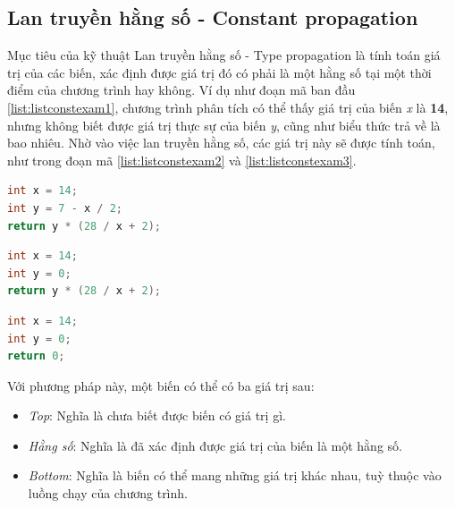 \subsection{Lan truyền hằng số - Constant propagation}
Mục tiêu của kỹ thuật Lan truyền hằng số - Type propagation \cite{constantpropagation} là tính toán giá trị của các biến, xác định được giá trị đó có phải là một hằng số tại một thời điểm của chương trình hay không. Ví dụ như đoạn mã ban đầu \ref{list:listconstexam1}, chương trình phân tích có thể thấy giá trị của biến \textit{x} là \textbf{14}, nhưng không biết được giá trị thực sự của biến \textit{y}, cũng như biểu thức trả về là bao nhiêu. Nhờ vào việc lan truyền hằng số, các giá trị này sẽ được tính toán, như trong đoạn mã \ref{list:listconstexam2} và \ref{list:listconstexam3}.
\begin{lstlisting}[caption={Đoạn mã trước khi thực hiện lan truyền hằng số},label={list:listconstexam1}, language=c++]
int x = 14;
int y = 7 - x / 2;
return y * (28 / x + 2);
\end{lstlisting}
\begin{lstlisting}[caption={Đoạn mã sau khi thực hiện lan truyền hằng số cho biến y},label={list:listconstexam2}, language=c++]
int x = 14;
int y = 0;
return y * (28 / x + 2);
\end{lstlisting}
\begin{lstlisting}[caption={Đoạn mã sau khi thực hiện lan truyền hằng số cho biểu thức trả về},label={list:listconstexam3}, language=c++]
int x = 14;
int y = 0;
return 0;
\end{lstlisting}
Với phương pháp này, một biến có thể có ba giá trị sau:
\begin{itemize}
	\item \textit{Top}: Nghĩa là chưa biết được biến có giá trị gì.
	\item \textit{Hằng số}: Nghĩa là đã xác định được giá trị của biến là một hằng số.
	\item \textit{Bottom}: Nghĩa là biến có thể mang những giá trị khác nhau, tuỳ thuộc vào luồng chạy của chương trình.
\end{itemize}

